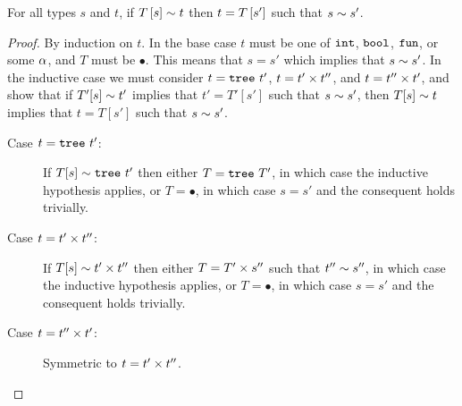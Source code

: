 
\begin{lem}
\label{lem:context-compat}
For all types $s$ and $t$,
if $T\left[s\right] \sim t$
then $t = T\left[s'\right]$
such that $s \sim s'$.
\end{lem}
\begin{proof} %



  By induction on $t$.
  In the base case $t$ must be one of $\mathtt{int}$, $\mathtt{bool}$, $\mathtt{fun}$, or
  some $\alpha$, and $T$ must be $\bullet$. This means that $s = s'$
  which implies that $s \sim s'$.
  In the inductive case we must consider
  $t = \mathtt{tree}\ t'$,
  $t = t' \times t''$, and
  $t = t'' \times t'$,
  and show that
  if $T'[s] \sim t'$ implies that $t' = T'[s']$ such that
     $s \sim s'$,
  then $T[s] \sim t$ implies that $t = T[s']$ such that
       $s \sim s'$.
  \begin{description}
  \item[Case $t = \mathtt{tree}\ t'$:]
    If $T[s] \sim \mathtt{tree}\ t'$ then either $T = \mathtt{tree}\ T'$, in
    which case the inductive hypothesis applies, or $T = \bullet$, in
    which case $s = s'$ and the consequent holds trivially.
  \item[Case $t = t' \times t''$:]
    If $T[s] \sim t' \times t''$
    then either $T = T' \times s''$ such that $t'' \sim s''$, in
    which case the inductive hypothesis applies, or $T = \bullet$, in
    which case $s = s'$ and the consequent holds trivially.
  \item[Case $t = t'' \times t'$:] Symmetric to $t = t' \times t''$.
  \end{description}
\end{proof}

